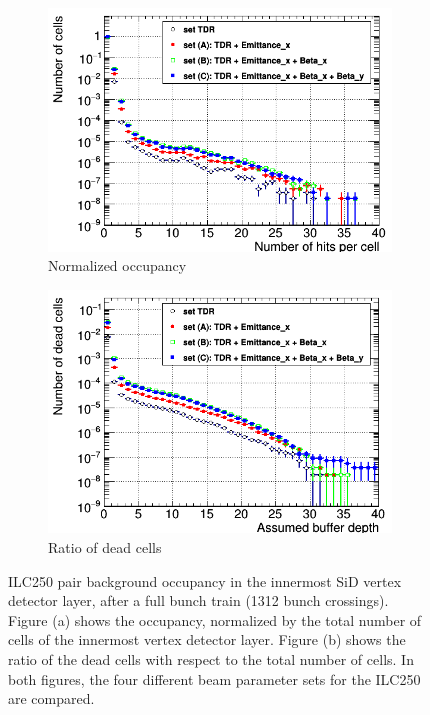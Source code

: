  \begin{figure}[h]
 \centering
  \begin{subfigure}[b]{0.49\textwidth}
   \centering
    \includegraphics[width=\textwidth]{Figures/Pairs/Occupancy_Comparison_Layer_0_numcells_ILC250_Comparison_ALL_SETS_5T_w_antiDiD_LEG.png}
   \caption{Normalized occupancy}
   \end{subfigure}
   \hfill
    \begin{subfigure}[b]{0.49\textwidth}
   \centering
    \includegraphics[width=\textwidth]{Figures/Pairs/Occupancy_Comparison_Layer_0_deadcells_ILC250_Comparison_ALL_SETS_5T_w_antiDiD_LEG.png}
   \caption{Ratio of dead cells}
   \end{subfigure}
   \caption[Pair background occupancy in the SiD vertex detector layer 0 for the ILC250]{ILC250 pair background occupancy in the innermost SiD vertex detector layer, after a full bunch train (1312 bunch crossings).
   Figure (a) shows the occupancy, normalized by the total number of cells of the innermost vertex detector layer.
   Figure (b) shows the ratio of the dead cells with respect to the total number of cells.
   In both figures, the four different beam parameter sets for the ILC250 are compared.
   }
   \label{fig:PairBkg:ILC250_Occupancy_Layer0}
 \end{figure}
